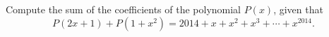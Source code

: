 Compute the sum of the coefficients of the polynomial $P(x)$, given that
\[P(2x+1)+P(1+x^2)=2014+x+x^2+x^3+\cdots+x^{2014}.\]
